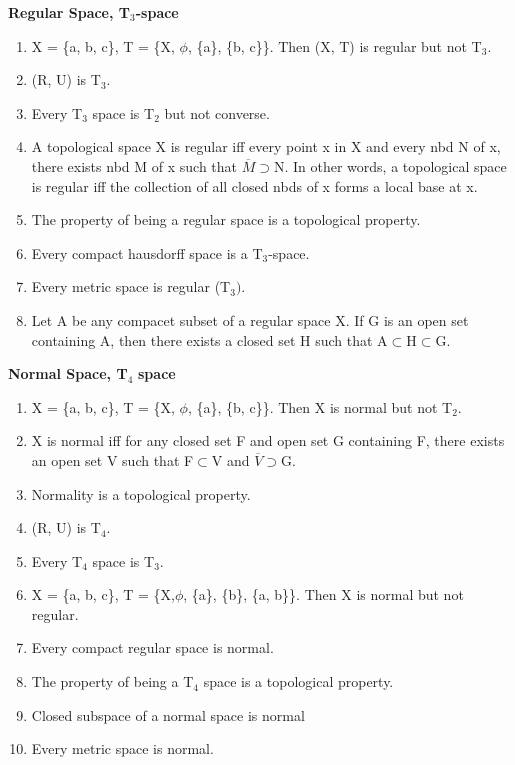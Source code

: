 \documentclass[12pt]{amsart}
\begin{document}
\textbf{Regular Space, T}$_{3}$\textbf{-space}

\begin{enumerate}
\item X = {\{}a, b, c{\}}, T = {\{}X, $\phi $, {\{}a{\}}, {\{}b, c{\}}{\}}. Then (X, T) is regular but not T$_{3}$.
\item (R, U) is T$_{3}$.
\item Every T$_{3}$ space is T$_{2}$ but not converse.
\item A topological space X is regular iff every point x in X and every nbd N of x, there exists nbd M of x such that $\overline M \supset $N. In other words, a topological space is regular iff the collection of all closed nbds of x forms a local base at x.
\item The property of being a regular space is a topological property.
\item Every compact hausdorff space is a T$_{3}$-space.
\item Every metric space is regular (T$_{3})$.
\item Let A be any compacet subset of a regular space X. If G is an open set containing A, then there exists a closed set H such that A$\subset $H$\subset $G.
\end{enumerate}

\textbf{Normal Space, T}$_{4}$\textbf{ space}

\begin{enumerate}
\item X = {\{}a, b, c{\}}, T = {\{}X, $\phi $, {\{}a{\}}, {\{}b, c{\}}{\}}. Then X is normal but not T$_{2}$.
\item X is normal iff for any closed set F and open set G containing F, there exists an open set V such that F$\subset $V and $\overline V \supset $G.
\item Normality is a topological property.
\item (R, U) is T$_{4}$.
\item Every T$_{4}$ space is T$_{3}$.
\item X = {\{}a, b, c{\}}, T = {\{}X,$\phi $, {\{}a{\}}, {\{}b{\}}, {\{}a, b{\}}{\}}. Then X is normal but not regular.
\item Every compact regular space is normal.
\item The property of being a T$_{4}$ space is a topological property.
\item Closed subspace of a normal space is normal
\item Every metric space is normal.
\end{enumerate}
\end{document}
